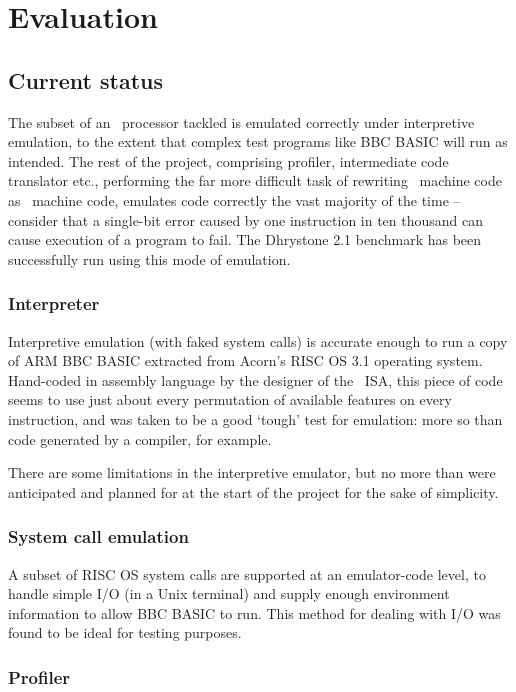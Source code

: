 \chapter{Evaluation}

\section{Current status}

The subset of an \arm\ processor tackled is emulated correctly under interpretive emulation, to the extent that complex test programs like BBC BASIC will run as intended. The rest of the project, comprising profiler, intermediate code translator etc., performing the far more difficult task of rewriting \arm\ machine code as \ia\ machine code, emulates code correctly the vast majority of the time -- consider that a single-bit error caused by one instruction in ten thousand can cause execution of a program to fail. The Dhrystone 2.1 benchmark has been successfully run using this mode of emulation.

\subsection{Interpreter}

Interpretive emulation (with faked system calls) is accurate enough to run a copy of ARM BBC BASIC extracted from Acorn's RISC OS 3.1 operating system. Hand-coded in assembly language by the designer of the \arm\ ISA, this piece of code seems to use just about every permutation of available features on every instruction, and was taken to be a good `tough' test for emulation: more so than code generated by a compiler, for example.

There are some limitations in the interpretive emulator, but no more than were anticipated and planned for at the start of the project for the sake of simplicity.

\subsection{System call emulation}

A subset of RISC OS system calls are supported at an emulator-code level, to handle simple I/O (in a Unix terminal) and supply enough environment information to allow BBC BASIC to run. This method for dealing with I/O was found to be ideal for testing purposes.

\subsection{Profiler}

